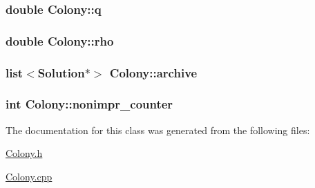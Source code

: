 \hypertarget{classColony_34885da4424133c87e8c887ea9b26f14}{
\subsubsection{\setlength{\rightskip}{0pt plus 5cm}double {\bf Colony::q}}}
\label{classColony_34885da4424133c87e8c887ea9b26f14}


\hypertarget{classColony_49231f75985e7ba471f22438e5449714}{
\subsubsection{\setlength{\rightskip}{0pt plus 5cm}double {\bf Colony::rho}}}
\label{classColony_49231f75985e7ba471f22438e5449714}


\hypertarget{classColony_74323b8c562a6e02b786be593a6ad25b}{
\subsubsection{\setlength{\rightskip}{0pt plus 5cm}list$<${\bf Solution}$\ast$$>$ {\bf Colony::archive}}}
\label{classColony_74323b8c562a6e02b786be593a6ad25b}


\hypertarget{classColony_f6d58daa2f800a0c086c43ff0a8d49d0}{
\subsubsection{\setlength{\rightskip}{0pt plus 5cm}int {\bf Colony::nonimpr\_\-counter}}}
\label{classColony_f6d58daa2f800a0c086c43ff0a8d49d0}




The documentation for this class was generated from the following files:\begin{CompactItemize}
\item 
\hyperlink{Colony_8h}{Colony.h}\item 
\hyperlink{Colony_8cpp}{Colony.cpp}\end{CompactItemize}
